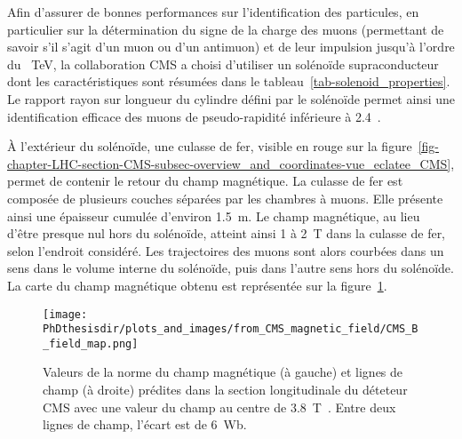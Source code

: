 \par Afin d'assurer de bonnes performances sur l'identification des particules, en particulier sur la détermination du signe de la charge des muons (permettant de savoir s'il s'agit d'un muon ou d'un antimuon) et de leur impulsion jusqu'à l'ordre du \SI{}{\TeV}, la collaboration CMS a choisi d'utiliser un solénoïde supraconducteur~\cite{cms_paper,CERN-LHCC-97-010,CMS_TDR_1,CMS_magnet} dont les caractéristiques sont résumées dans le tableau~\ref{tab-solenoid_properties}.
Le rapport rayon sur longueur du cylindre défini par le solénoïde permet ainsi une identification efficace des muons de pseudo-rapidité inférieure à \num{2.4}~\cite{CERN-LHCC-97-010}.
\par À l'extérieur du solénoïde, une culasse de fer, visible en rouge sur la figure~\ref{fig-chapter-LHC-section-CMS-subsec-overview_and_coordinates-vue_eclatee_CMS}, permet de contenir le retour du champ magnétique.
La culasse de fer est composée de plusieurs couches séparées par les chambres à muons.
Elle présente ainsi une épaisseur cumulée d'environ \SI{1.5}{\meter}.
Le champ magnétique, au lieu d'être presque nul hors du solénoïde, atteint ainsi \num{1} à \SI{2}{\tesla} dans la culasse de fer, selon l'endroit considéré.
Les trajectoires des muons sont alors courbées dans un sens dans le volume interne du solénoïde, puis dans l'autre sens hors du solénoïde.
La carte du champ magnétique obtenu est représentée sur la figure~\ref{fig-chapter-LHC-section-CMS-subsec-solenoide-CMS_B_field_map}.
\begin{figure}[h]
\centering
\texttt{[image: \\PhDthesisdir/plots\_and\_images/from\_CMS\_magnetic\_field/CMS\_B\_field\_map.png]}
\caption[Champ magnétique dans le détecteur CMS.]{Valeurs de la norme du champ magnétique (à gauche) et lignes de champ (à droite) prédites dans la section longitudinale du déteteur CMS avec une valeur du champ au centre de \SI{3.8}{\tesla}~\cite{CMS_magnetic_field}. Entre deux lignes de champ, l'écart est de \SI{6}{\weber}.}
\label{fig-chapter-LHC-section-CMS-subsec-solenoide-CMS_B_field_map}
\end{figure}